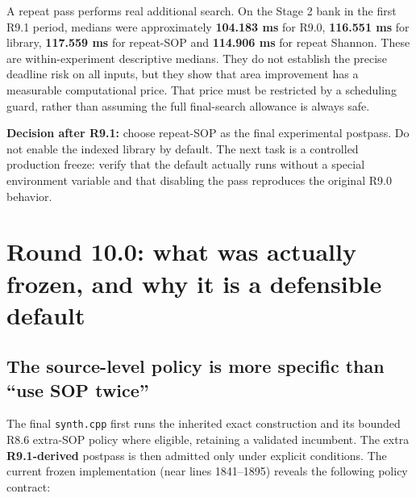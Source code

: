 A repeat pass performs real additional search. On the Stage 2 bank in the first R9.1 period, medians were approximately \textbf{104.183 ms} for R9.0, \textbf{116.551 ms} for library, \textbf{117.559 ms} for repeat-SOP and \textbf{114.906 ms} for repeat Shannon. These are within-experiment descriptive medians. They do not establish the precise deadline risk on all inputs, but they show that area improvement has a measurable computational price. That price must be restricted by a scheduling guard, rather than assuming the full final-search allowance is always safe.

\begin{tcolorbox}[colback=ResearchBlue!6!white,colframe=ResearchSlate!55!white,boxrule=0.65pt,arc=1mm,breakable]
\textbf{Decision after R9.1:} choose repeat-SOP as the final experimental postpass. Do not enable the indexed library by default. The next task is a controlled production freeze: verify that the default actually runs without a special environment variable and that disabling the pass reproduces the original R9.0 behavior.
\end{tcolorbox}

\section{Round 10.0: what was actually frozen, and why it is a defensible default}\label{round-10.0-what-was-actually-frozen-and-why-it-is-a-defensible-default}

\subsection{The source-level policy is more specific than ``use SOP twice''}\label{the-source-level-policy-is-more-specific-than-use-sop-twice}

The final \texttt{synth.cpp} first runs the inherited exact construction and its bounded R8.6 extra-SOP policy where eligible, retaining a validated incumbent. The extra \textbf{R9.1-derived} postpass is then admitted only under explicit conditions. The current frozen implementation (near lines 1841--1895) reveals the following policy contract:

